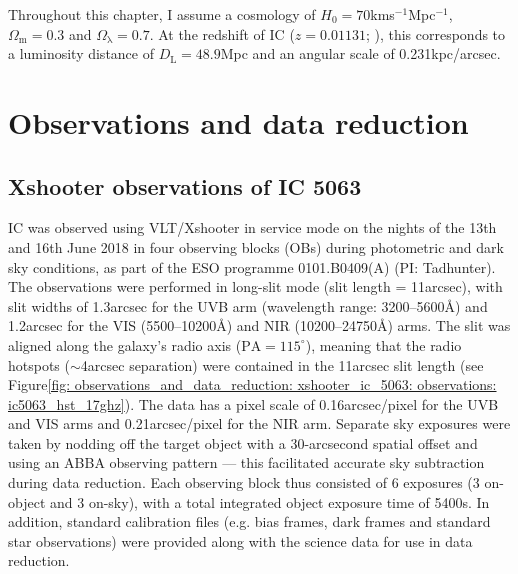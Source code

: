 Throughout this chapter, I assume a cosmology of $H_\mathrm{0} = 70$\;km\;s$^{-1}$\;Mpc$^{-1}$, $\Omega_\mathrm{m}=0.3$ and ${\Omega}_\mathrm{\lambda}=0.7$. At the redshift of IC ($z=0.01131$; \citealt{Tadhunter2014}), this corresponds to a luminosity distance of $D_\mathrm{L}=48.9$\;Mpc and an angular scale of 0.231\;kpc/arcsec.

\section{Observations and data reduction}
\label{section: xshooter_ic5063: observations_and_data_reduction}

\subsection{Xshooter observations of IC 5063}
\label{section: xshooter_ic5063: observations_and_data_reduction: observations}

IC was observed using VLT/Xshooter in service mode on the nights of the 13th and 16th June 2018 in four observing blocks (OBs) during photometric and dark sky conditions, as part of the ESO programme 0101.B0409(A) (PI: Tadhunter). The observations were performed in long-slit mode (slit length = 11\;arcsec), with slit widths of 1.3\;arcsec for the UVB arm (wavelength range: 3200--5600\;\AA) and 1.2\;arcsec for the VIS (5500--10200\;\AA) and NIR (10200--24750\;\AA) arms. The slit was aligned along the galaxy's radio axis ($\mathrm{PA}=115^{\circ}$), meaning that the radio hotspots ($\sim$4\;arcsec separation) were contained in the 11\;arcsec slit length (see Figure\;\ref{fig: observations_and_data_reduction: xshooter_ic_5063: observations: ic5063_hst_17ghz}). The data has a pixel scale of 0.16\;arcsec/pixel for the UVB and VIS arms and 0.21\;arcsec/pixel for the NIR arm. Separate sky exposures were taken by nodding off the target object with a 30-arcsecond spatial offset and using an ABBA observing pattern --- this facilitated accurate sky subtraction during data reduction. Each observing block thus consisted of 6 exposures (3 on-object and 3 on-sky), with a total integrated object exposure time of 5400\;s. In addition, standard calibration files (e.g. bias frames, dark frames and standard star observations) were provided along with the science data for use in data reduction.

